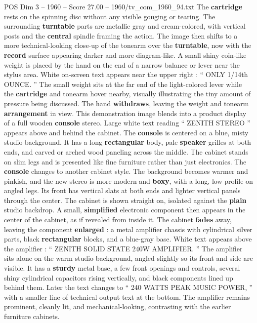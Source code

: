 \begin{textsample}{POS Dim 3 – 1960 – Score 27.00 – 1960/tv\_com\_1960\_94.txt}
The \textbf{cartridge} rests on the spinning disc without any visible gouging or tearing.
The surrounding \textbf{turntable} parts are metallic gray and cream-colored, with vertical posts and the \textbf{central} spindle framing the action.
The image then shifts to a more technical-looking close-up of the tonearm over the \textbf{turntable}, now with the \textbf{record} surface appearing darker and more diagram-like.
A small shiny coin-like weight is placed by the hand on the end of a narrow balance or lever near the stylus area.
White on-screen text appears near the upper right : “ ONLY 1/14th OUNCE. ” The small weight sits at the far end of the light-colored lever while the \textbf{cartridge} and tonearm hover nearby, visually illustrating the tiny amount of pressure being discussed.
The hand \textbf{withdraws}, leaving the weight and tonearm \textbf{arrangement} in view.
This demonstration image blends into a product display of a full wooden \textbf{console} stereo.
Large white text reading “ ZENITH STEREO ” appears above and behind the cabinet.
The \textbf{console} is centered on a blue, misty studio background.
It has a long \textbf{rectangular} body, pale \textbf{speaker} grilles at both ends, and carved or arched wood paneling across the middle.
The cabinet stands on slim legs and is presented like fine furniture rather than just electronics.
The \textbf{console} changes to another cabinet style.
The background becomes warmer and pinkish, and the new stereo is more modern and \textbf{boxy}, with a long, low profile on angled legs.
Its front has vertical slats at both ends and lighter vertical panels through the center.
The cabinet is shown straight on, isolated against the \textbf{plain} studio backdrop.
A small, \textbf{simplified} electronic component then appears in the center of the cabinet, as if revealed from inside it.
The cabinet \textbf{fades} away, leaving the component \textbf{enlarged} : a metal amplifier chassis with cylindrical silver parts, black \textbf{rectangular} blocks, and a blue-gray base.
White text appears above the amplifier : “ ZENITH SOLID STATE 240W AMPLIFIER. ” The amplifier sits alone on the warm studio background, angled slightly so its front and side are visible.
It has a \textbf{sturdy} metal base, a few front openings and controls, several shiny cylindrical capacitors rising vertically, and black components lined up behind them.
Later the text changes to “ 240 WATTS PEAK MUSIC POWER, ” with a smaller line of technical output text at the bottom.
The amplifier remains prominent, cleanly lit, and mechanical-looking, contrasting with the earlier furniture cabinets.

\end{textsample}

